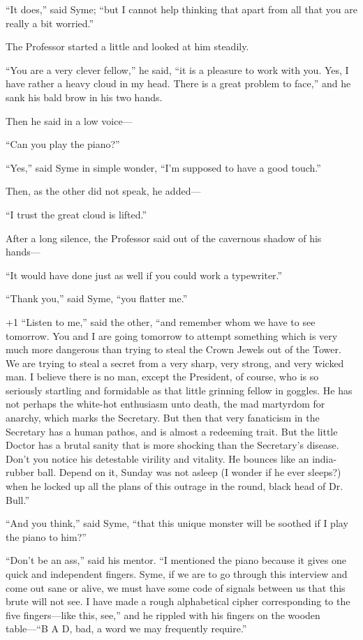 “It does,” said Syme; “but I cannot help thinking that apart from all that you are really a bit worried.”

The Professor started a little and looked at him steadily.

“You are a very clever fellow,” he said, “it is a pleasure to work with you. Yes, I have rather a heavy cloud in my head. There is a great problem to face,” and he sank his bald brow in his two hands.

Then he said in a low voice⁠—

“Can you play the piano?”

“Yes,” said Syme in simple wonder, “I’m supposed to have a good touch.”

Then, as the other did not speak, he added⁠—

“I trust the great cloud is lifted.”

After a long silence, the Professor said out of the cavernous shadow of his hands⁠—

“It would have done just as well if you could work a typewriter.”

“Thank you,” said Syme, “you flatter me.”

\looseness+1
“Listen to me,” said the other, “and remember whom we have to see tomorrow. You and I are going tomorrow to attempt something which is very much more dangerous than trying to steal the Crown Jewels out of the Tower. We are trying to steal a secret from a very sharp, very strong, and very wicked man. I believe there is no man, except the President, of course, who is so seriously startling and formidable as that little grinning fellow in goggles. He has not perhaps the white-hot enthusiasm unto death, the mad martyrdom for anarchy, which marks the Secretary. But then that very fanaticism in the Secretary has a human pathos, and is almost a redeeming trait. But the little Doctor has a brutal sanity that is more shocking than the Secretary’s disease. Don’t you notice his detestable virility and vitality. He bounces like an india-rubber ball. Depend on it, Sunday was not asleep (I wonder if he ever sleeps?) when he locked up all the plans of this outrage in the round, black head of Dr. Bull.”

“And you think,” said Syme, “that this unique monster will be soothed if I play the piano to him?”

“Don’t be an ass,” said his mentor. “I mentioned the piano because it gives one quick and independent fingers. Syme, if we are to go through this interview and come out sane or alive, we must have some code of signals between us that this brute will not see. I have made a rough alphabetical cipher corresponding to the five fingers⁠—like this, see,” and he rippled with his fingers on the wooden table⁠—“B A D, bad, a word we may frequently require.”

